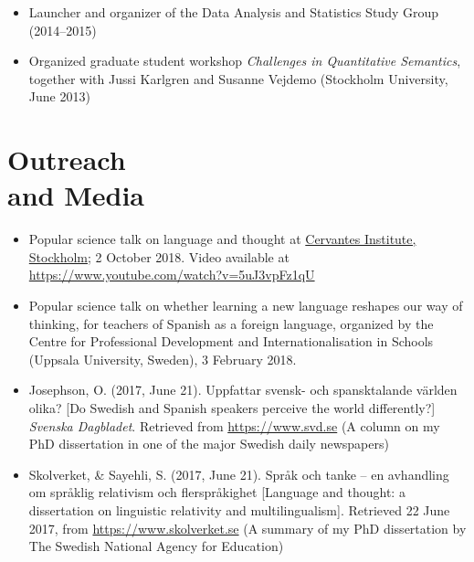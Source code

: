 \documentclass[margin, 11pt]{res} %
\begin{document}
\begin{resume}
\begin{itemize}
\item Launcher and organizer of the Data Analysis and Statistics Study Group (2014--2015)

\item Organized graduate student workshop \emph{Challenges in Quantitative Semantics}, together with Jussi Karlgren and Susanne Vejdemo (Stockholm University, June 2013)

\end{itemize}



\section{\sc Outreach \\and Media}

\begin{itemize}

\item Popular science talk on language and thought at \href{https://cultura.cervantes.es/estocolmo/es/-hablas-como-piensas--la-relacion-entre-el-lenguaje-y-el-pensamiento/122695}{Cervantes Institute, Stockholm}; 2 October 2018.
Video available at \url{https://www.youtube.com/watch?v=5uJ3vpFz1qU}

\item Popular science talk on whether learning a new language reshapes our way of thinking, for teachers of Spanish as a foreign language, organized by the Centre for Professional Development and Internationalisation in Schools (Uppsala University, Sweden), 3 February 2018.

\item Josephson, O. (2017, June 21). Uppfattar svensk- och spansktalande v{\"a}rlden olika? [Do Swedish and Spanish speakers perceive the world differently?] \emph{Svenska Dagbladet}. Retrieved from \url{https://www.svd.se} (A column on my PhD dissertation in one of the major Swedish daily newspapers)

\item Skolverket, \& Sayehli, S. (2017, June 21). Spr{\aa}k och tanke -- en avhandling om spr{\aa}klig relativism och flerspr{\aa}kighet [Language and thought: a dissertation on linguistic relativity and multilingualism]. Retrieved 22 June 2017, from \url{https://www.skolverket.se} (A summary of my PhD dissertation by The Swedish National Agency for Education)


\end{itemize}
\end{resume}
\end{document}
